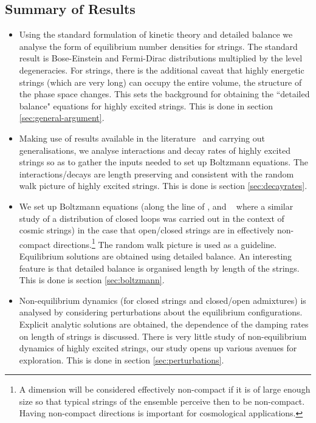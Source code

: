 \documentclass[a4paper,11pt]{article}
\begin{document}
\subsection*{Summary of Results}
%
\begin{itemize}
%
\item  Using the standard formulation of kinetic theory and detailed balance we analyse the 
form of equilibrium number densities for strings. The standard result is 
Bose-Einstein and Fermi-Dirac distributions multiplied by the level degeneracies. 
For strings, there is the additional caveat that highly energetic strings (which are very long) can
occupy the entire volume, the  structure of the phase space changes.
This sets the background for obtaining the ``detailed balance" equations for highly excited strings. This is done in section \ref{sec:general-argument}.

%
\item Making use of results available in the literature~\cite{Amati:1999fv,Manes:2001cs,Chen:2005ra} and  carrying out generalisations, we analyse interactions and decay rates of highly excited strings so as to gather the inputs needed to
set up Boltzmann equations. The interactions/decays are length preserving and  consistent
with the random walk picture of highly excited strings. This is done is section
\ref{sec:decayrates}.
%
\item We set up Boltzmann equations (along the line of \cite{Lowe:1994nm,Lee:1997iz}, and ~\cite{Copeland:1998na} where a  similar study of a distribution of closed loops was carried out in the context of cosmic strings) in the case that open/closed strings
are in effectively non-compact directions.\footnote{A dimension will be considered effectively non-compact if
it is of large enough size so that typical strings of the ensemble perceive then to be non-compact. Having non-compact directions is important for 
cosmological applications.}
The random walk picture is used as a guideline.
Equilibrium solutions are obtained using 
detailed balance. An interesting feature is that detailed balance is organised length by length
of the strings. This is done is section \ref{sec:boltzmann}.
%
\item Non-equilibrium dynamics (for  closed strings  and  closed/open admixtures) is analysed by considering perturbations about the equilibrium configurations. Explicit analytic solutions are obtained, the dependence of the damping rates on length of
strings is discussed. There is very little study of  non-equilibrium dynamics of highly excited strings, our study opens up various avenues
for exploration. This is done in section \ref{sec:perturbations}.



    
\end{itemize}
\end{document}
